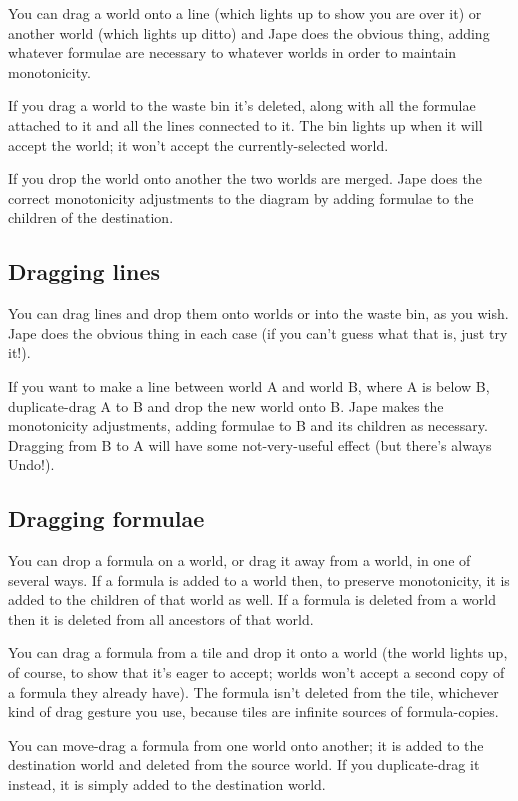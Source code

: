 \documentclass[11pt]{book}
\begin{document}
You can drag a world onto a line (which lights up to show you are over it) or another world (which lights up ditto) and Jape does the obvious thing, adding whatever formulae are necessary to whatever worlds in order to maintain monotonicity.

If you drag a world to the waste bin it's deleted, along with all the formulae attached to it and all the lines connected to it. The bin lights up when it will accept the world; it won't accept the currently-selected world.

If you drop the world onto another the two worlds are merged. Jape does the correct monotonicity adjustments to the diagram by adding formulae to the children of the destination.

\subsection{Dragging lines}

You can drag lines and drop them onto worlds or into the waste bin, as you wish. Jape does the obvious thing in each case (if you can't guess what that is, just try it!).

If you want to make a line between world A and world B, where A is below B, duplicate-drag A to B and drop the new world onto B. Jape makes the monotonicity adjustments, adding formulae to B and its children as necessary. Dragging from B to A will have some not-very-useful effect (but there's always Undo!).

\subsection{Dragging formulae}

You can drop a formula on a world, or drag it away from a world, in one of several ways. If a formula is added to a world then, to preserve monotonicity, it is added to the children of that world as well. If a formula is deleted from a world then it is deleted from all ancestors of that world.

You can drag a formula from a tile and drop it onto a world (the world lights up, of course, to show that it's eager to accept; worlds won't accept a second copy of a formula they already have). The formula isn't deleted from the tile, whichever kind of drag gesture you use, because tiles are infinite sources of formula-copies.

You can move-drag a formula from one world onto another; it is added to the destination world and deleted from the source world. If you duplicate-drag it instead, it is simply added to the destination world.
\end{document}
